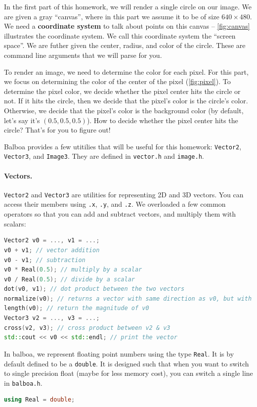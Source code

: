 In the first part of this homework, we will render a single circle on our image. We are given a gray ``canvas'', where in this part we assume it to be of size $640 \times 480$. We need a \textbf{coordinate system} to talk about points on this canvas -- \cref{fig:canvas} illustrates the coordinate system. We call this coordinate system the ``screen space''.
We are futher given the center, radius, and color of the circle. These are command line arguments that we will parse for you.

To render an image, we need to determine the color for each pixel. For this part, we focus on determining the color of the center of the pixel (\cref{fig:pixel}). To determine the pixel color, we decide whether the pixel center hits the circle or not. If it hits the circle, then we decide that the pixel's color is the circle's color. Otherwise, we decide that the pixel's color is the background color (by default, let's say it's $(0.5, 0.5, 0.5)$). How to decide whether the pixel center hits the circle? That's for you to figure out!

Balboa provides a few utitilies that will be useful for this homework: \lstinline{Vector2}, \lstinline{Vector3}, and \lstinline{Image3}. They are defined in \lstinline{vector.h} and \lstinline{image.h}. 

\paragraph{Vectors.} \lstinline{Vector2} and \lstinline{Vector3} are utilities for representing 2D and 3D vectors. You can access their members using \lstinline{.x}, \lstinline{.y}, and \lstinline{.z}. We overloaded a few common operators so that you can add and subtract vectors, and multiply them with scalars:
\begin{lstlisting}[language=C++]
Vector2 v0 = ..., v1 = ...;
v0 + v1; // vector addition
v0 - v1; // subtraction
v0 * Real(0.5); // multiply by a scalar
v0 / Real(0.5); // divide by a scalar
dot(v0, v1); // dot product between the two vectors
normalize(v0); // returns a vector with same direction as v0, but with magnitude of 1
length(v0); // return the magnitude of v0
Vector3 v2 = ..., v3 = ...;
cross(v2, v3); // cross product between v2 & v3
std::cout << v0 << std::endl; // print the vector
\end{lstlisting}
In balboa, we represent floating point numbers using the type \lstinline{Real}. It is by default defined to be a \lstinline{double}. It is designed such that when you want to switch to single precision float (maybe for less memory cost), you can switch a single line in \lstinline{balboa.h}.
\begin{lstlisting}[language=C++]
using Real = double;
\end{lstlisting}

